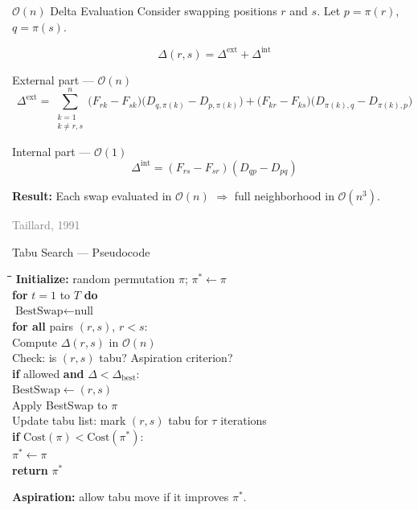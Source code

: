 \documentclass[aspectratio=169,11pt]{beamer}
\newcommand{\BigO}{\mathcal{O}}
\newcommand{\reference}[1]{\hfill{\scriptsize\textcolor{gray}{#1}}}
\begin{document}
\begin{frame}{$\BigO(n)$ Delta Evaluation}
Consider swapping positions $r$ and $s$. Let $p=\pi(r)$, $q=\pi(s)$.

\vspace{4pt}
\[
  \Delta(r,s) = \Delta^{\text{ext}} + \Delta^{\text{int}}
\]

\begin{block}{External part --- $\BigO(n)$}
\[
  \Delta^{\text{ext}} = \sum_{\substack{k=1\\k\neq r,s}}^{n}
  \bigl(F_{rk}-F_{sk}\bigr)\bigl(D_{q,\pi(k)}-D_{p,\pi(k)}\bigr)
  + \bigl(F_{kr}-F_{ks}\bigr)\bigl(D_{\pi(k),q}-D_{\pi(k),p}\bigr)
\]
\end{block}

\begin{block}{Internal part --- $\BigO(1)$}
\[
  \Delta^{\text{int}} =
  (F_{rs}-F_{sr})(D_{qp}-D_{pq})
\]
\end{block}

\textbf{Result:} Each swap evaluated in $\BigO(n)$ $\Rightarrow$ full neighborhood in $\BigO(n^3)$.

\reference{Taillard, 1991}
\end{frame}

\begin{frame}{Tabu Search --- Pseudocode}
\begin{block}{}
\small
\vspace{-2pt}
\begin{tabbing}
\hspace{4mm}\=\hspace{4mm}\=\hspace{4mm}\=\hspace{4mm}\=\kill
\textbf{Initialize:} random permutation $\pi$;\; $\pi^*\leftarrow\pi$\\[2pt]
\textbf{for} $t=1$ to $T$ \textbf{do}\\
\> $\text{BestSwap}\leftarrow\text{null}$\\
\> \textbf{for all} pairs $(r,s)$, $r<s$:\\
\>\> Compute $\Delta(r,s)$ in $\BigO(n)$\\
\>\> Check: is $(r,s)$ \alert{tabu}? Aspiration criterion?\\
\>\> \textbf{if} allowed \textbf{and} $\Delta<\Delta_{\text{best}}$:\\
\>\>\> $\text{BestSwap}\leftarrow(r,s)$\\[2pt]
\> Apply BestSwap to $\pi$\\
\> Update tabu list: mark $(r,s)$ tabu for $\tau$ iterations\\
\> \textbf{if} $\mathrm{Cost}(\pi)<\mathrm{Cost}(\pi^*)$:\\
\>\> $\pi^*\leftarrow\pi$\\[2pt]
\textbf{return} $\pi^*$
\end{tabbing}
\vspace{-4pt}
\end{block}
\vspace{2pt}
\textbf{Aspiration:} allow tabu move if it improves $\pi^*$.
\end{frame}
\end{document}

